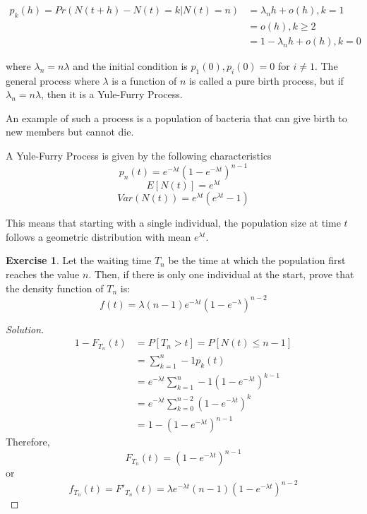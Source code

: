 \documentclass[12pt,letterpaper]{book}
\theoremstyle{definition}
\newtheorem*{exercise}{Exercise}
\newenvironment{solution}
  {\renewcommand\qedsymbol{$\blacksquare$}\begin{proof}[Solution]}
  {\end{proof}}
\begin{document}
\begin{align*}
  p_k(h) = Pr(N(t+h) - N(t) = k | N(t) = n) &= \lambda_n h + o(h), k = 1\\
                                            &= o(h), k \geq 2\\
                                            &= 1 - \lambda_nh + o(h), k = 0
\end{align*}

where $\lambda_n = n \lambda$ and the initial condition is $p_1(0), p_i(0) = 0$ for $i \neq 1$. The general process where $\lambda$ is a function of $n$ is called a pure birth process, but if $\lambda_n = n \lambda$, then it is a Yule-Furry Process.

An example of such a process is a population of bacteria that can give birth to new members but cannot die. 

\begin{theorem}
  A Yule-Furry Process is given by the following characteristics
  \[p_n(t) = e^{-\lambda t} (1 - e^{-\lambda t})^{n-1}\] 
  \[E[N(t)] = e^{\lambda t}\] 
  \[Var(N(t)) = e^{\lambda t} (e^{\lambda t} - 1)\]
\end{theorem}

This means that starting with a single individual, the population size at time $t$ follows a geometric distribution with mean $e^{\lambda t}$.

\begin{exercise}
Let the waiting time $T_n$ be the time at which the population first reaches the value $n$. Then, if there is only one individual at the start, prove that the density function of $T_n$ is:
\[f(t) = \lambda(n-1) e^{-\lambda t} (1 - e^{-\lambda})^{n-2}\]
\end{exercise}
\begin{solution}
  \begin{align*}
    1 - F_{T_n}(t) &= P[T_n > t] = P[N(t) \leq n-1]  \\
                   &= \sum_{k=1}^n-1 p_k(t) \\
                   &= e^{-\lambda t} \sum_{k=1}^n-1 (1-e^{-\lambda t})^{k-1} \\
                   &= e^{-\lambda t} \sum_{k=0}^{n-2} (1 - e^{-\lambda t})^k \\
                   &= 1 - (1- e^{-\lambda t})^{n-1}
  \end{align*} 
  Therefore,
  \[F_{T_n}(t) = (1- e^{-\lambda t})^{n-1}\]
  or
  \[f_{T_n}(t) = F'_{T_n}(t) = \lambda e^{-\lambda t}(n-1) (1- e^{-\lambda t})^{n-2}\]
\end{solution}
\end{document}

